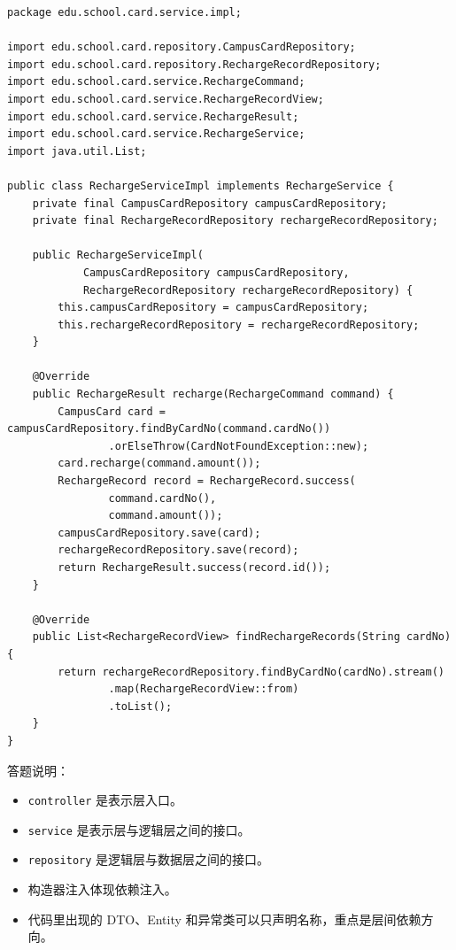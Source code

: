 \documentclass[UTF8,zihao=-4]{ctexart}
\begin{document}
\small
\begin{verbatim}
package edu.school.card.service.impl;

import edu.school.card.repository.CampusCardRepository;
import edu.school.card.repository.RechargeRecordRepository;
import edu.school.card.service.RechargeCommand;
import edu.school.card.service.RechargeRecordView;
import edu.school.card.service.RechargeResult;
import edu.school.card.service.RechargeService;
import java.util.List;

public class RechargeServiceImpl implements RechargeService {
    private final CampusCardRepository campusCardRepository;
    private final RechargeRecordRepository rechargeRecordRepository;

    public RechargeServiceImpl(
            CampusCardRepository campusCardRepository,
            RechargeRecordRepository rechargeRecordRepository) {
        this.campusCardRepository = campusCardRepository;
        this.rechargeRecordRepository = rechargeRecordRepository;
    }

    @Override
    public RechargeResult recharge(RechargeCommand command) {
        CampusCard card = campusCardRepository.findByCardNo(command.cardNo())
                .orElseThrow(CardNotFoundException::new);
        card.recharge(command.amount());
        RechargeRecord record = RechargeRecord.success(
                command.cardNo(),
                command.amount());
        campusCardRepository.save(card);
        rechargeRecordRepository.save(record);
        return RechargeResult.success(record.id());
    }

    @Override
    public List<RechargeRecordView> findRechargeRecords(String cardNo) {
        return rechargeRecordRepository.findByCardNo(cardNo).stream()
                .map(RechargeRecordView::from)
                .toList();
    }
}
\end{verbatim}
\normalsize

答题说明：

\begin{itemize}
\item \texttt{controller} 是表示层入口。
\item \texttt{service} 是表示层与逻辑层之间的接口。
\item \texttt{repository} 是逻辑层与数据层之间的接口。
\item 构造器注入体现依赖注入。
\item 代码里出现的 DTO、Entity 和异常类可以只声明名称，重点是层间依赖方向。
\end{itemize}
\end{document}
